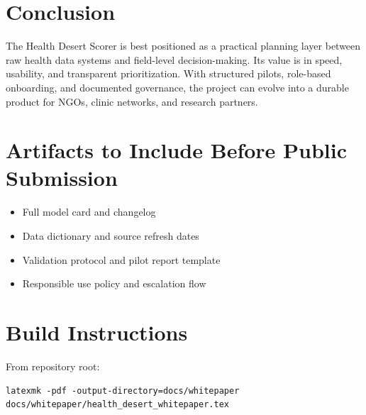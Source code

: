 \documentclass[11pt]{article}
\begin{document}
\section{Conclusion}
The Health Desert Scorer is best positioned as a practical planning layer between raw health data systems and field-level decision-making. Its value is in speed, usability, and transparent prioritization. With structured pilots, role-based onboarding, and documented governance, the project can evolve into a durable product for NGOs, clinic networks, and research partners.

\appendix
\section{Artifacts to Include Before Public Submission}
\begin{itemize}[leftmargin=1.5em]
  \item Full model card and changelog
  \item Data dictionary and source refresh dates
  \item Validation protocol and pilot report template
  \item Responsible use policy and escalation flow
\end{itemize}

\section{Build Instructions}
From repository root:
\begin{verbatim}
latexmk -pdf -output-directory=docs/whitepaper docs/whitepaper/health_desert_whitepaper.tex
\end{verbatim}
\end{document}
